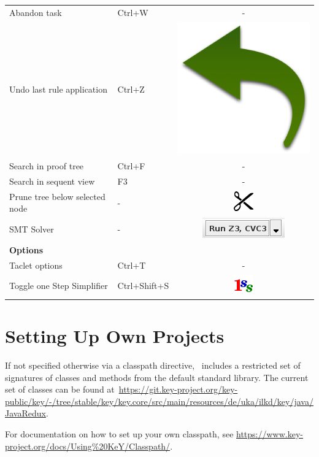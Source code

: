 \begin{tabular}{llc}
Abandon task &Ctrl+W & -\\
Undo last rule application & Ctrl+Z & \includegraphics[width=2ex]{../figures/goalBack}\\
Search in proof tree & Ctrl+F & -\\
Search in sequent view & F3 & -\\
Prune tree below selected node & - & \includegraphics[width=2ex]{../figures/pruneProof} \\
SMT Solver & - &  \includegraphics[width=10ex]{../figures/SMTButton} \\
\midrule
\multicolumn{3}{l}{\textbf{Options}}\\
Taclet options &Ctrl+T&-\\
Toggle one Step Simplifier & Ctrl+Shift+S & \includegraphics[width=2ex]{../figures/oneStepSimplifier}\\
\bottomrule
\end{tabular}

\section{Setting Up Own Projects}
\label{app:configuringProjects}

If not specified otherwise via a classpath directive, \KeY\ includes a
restricted set of signatures of classes and methods from the default
standard library. The current set of classes can be found at~\url{https://git.key-project.org/key-public/key/-/tree/stable/key/key.core/src/main/resources/de/uka/ilkd/key/java/JavaRedux}.

For documentation on how to set up your own classpath, see \url{https://www.key-project.org/docs/Using\%20KeY/Classpath/}.
	

